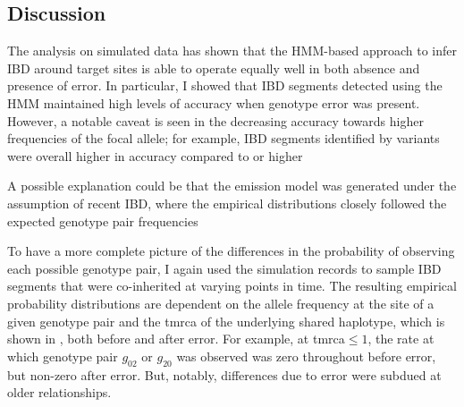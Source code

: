 %
\subsection{Discussion}
%

The analysis on simulated data has shown that the HMM-based approach to infer IBD around target sites is able to operate equally well in both absence and presence of error.
In particular, I showed that IBD segments detected using the HMM maintained high levels of accuracy when genotype error was present.
However, a notable caveat is seen in the decreasing accuracy towards higher frequencies of the focal allele; for example, IBD segments identified by  variants were overall higher in accuracy compared to  or higher

A possible explanation could be that the emission model was generated under the assumption of recent IBD, where the empirical distributions closely followed the expected genotype pair frequencies 

To have a more complete picture of the differences in the probability of observing each possible genotype pair, I again used the simulation records to sample IBD segments that were co-inherited at varying points in time.
The resulting empirical probability distributions are dependent on the allele frequency at the site of a given genotype pair and the \gls{tmrca} of the underlying shared haplotype, which is shown in , both before and after error.
For example, at \gls{tmrca}$\leq1$, the rate at which genotype pair $g_{02}$ or $g_{20}$ was observed was zero throughout before error, but non-zero after error.
But, notably, differences due to error were subdued at older relationships.

%

%




